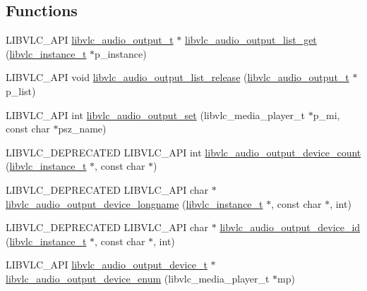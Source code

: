 \subsection*{Functions}
\begin{DoxyCompactItemize}
\item 
L\+I\+B\+V\+L\+C\+\_\+\+A\+PI \hyperlink{structlibvlc__audio__output__t}{libvlc\+\_\+audio\+\_\+output\+\_\+t} $\ast$ \hyperlink{group__libvlc__audio_gabdb1104576d289121beb13cb4def720f}{libvlc\+\_\+audio\+\_\+output\+\_\+list\+\_\+get} (\hyperlink{group__libvlc__core_ga316d739a80da4678206c79f4d6c2e284}{libvlc\+\_\+instance\+\_\+t} $\ast$p\+\_\+instance)
\item 
L\+I\+B\+V\+L\+C\+\_\+\+A\+PI void \hyperlink{group__libvlc__audio_ga9f573074e83bd671b90468b459dc9577}{libvlc\+\_\+audio\+\_\+output\+\_\+list\+\_\+release} (\hyperlink{structlibvlc__audio__output__t}{libvlc\+\_\+audio\+\_\+output\+\_\+t} $\ast$p\+\_\+list)
\item 
L\+I\+B\+V\+L\+C\+\_\+\+A\+PI int \hyperlink{group__libvlc__audio_ga1e0e783b4b68a4544cc688d8f8c38284}{libvlc\+\_\+audio\+\_\+output\+\_\+set} (libvlc\+\_\+media\+\_\+player\+\_\+t $\ast$p\+\_\+mi, const char $\ast$psz\+\_\+name)
\item 
L\+I\+B\+V\+L\+C\+\_\+\+D\+E\+P\+R\+E\+C\+A\+T\+ED L\+I\+B\+V\+L\+C\+\_\+\+A\+PI int \hyperlink{group__libvlc__audio_gaa1ed7a231ff2020d60152c235f15f4cf}{libvlc\+\_\+audio\+\_\+output\+\_\+device\+\_\+count} (\hyperlink{group__libvlc__core_ga316d739a80da4678206c79f4d6c2e284}{libvlc\+\_\+instance\+\_\+t} $\ast$, const char $\ast$)
\item 
L\+I\+B\+V\+L\+C\+\_\+\+D\+E\+P\+R\+E\+C\+A\+T\+ED L\+I\+B\+V\+L\+C\+\_\+\+A\+PI char $\ast$ \hyperlink{group__libvlc__audio_gac5da6f9bf242c2c11fd2ea69e316fddb}{libvlc\+\_\+audio\+\_\+output\+\_\+device\+\_\+longname} (\hyperlink{group__libvlc__core_ga316d739a80da4678206c79f4d6c2e284}{libvlc\+\_\+instance\+\_\+t} $\ast$, const char $\ast$, int)
\item 
L\+I\+B\+V\+L\+C\+\_\+\+D\+E\+P\+R\+E\+C\+A\+T\+ED L\+I\+B\+V\+L\+C\+\_\+\+A\+PI char $\ast$ \hyperlink{group__libvlc__audio_gaa54dc93a0adeb65752d3a72848db630c}{libvlc\+\_\+audio\+\_\+output\+\_\+device\+\_\+id} (\hyperlink{group__libvlc__core_ga316d739a80da4678206c79f4d6c2e284}{libvlc\+\_\+instance\+\_\+t} $\ast$, const char $\ast$, int)
\item 
L\+I\+B\+V\+L\+C\+\_\+\+A\+PI \hyperlink{structlibvlc__audio__output__device__t}{libvlc\+\_\+audio\+\_\+output\+\_\+device\+\_\+t} $\ast$ \hyperlink{group__libvlc__audio_ga5d13bb70351f6fa597d8f1b553da81d5}{libvlc\+\_\+audio\+\_\+output\+\_\+device\+\_\+enum} (libvlc\+\_\+media\+\_\+player\+\_\+t $\ast$mp)

\end{DoxyCompactItemize}
